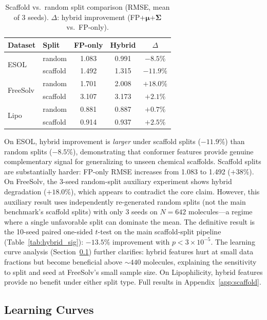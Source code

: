 \documentclass[sigconf]{acmart}
\newcommand{\rev}[1]{#1}
\begin{document}
\begin{table}[t]
\caption{Scaffold vs.\ random split comparison (RMSE, mean of 3 seeds). $\Delta$: hybrid improvement (FP+$\boldsymbol{\mu}$+$\boldsymbol{\Sigma}$ vs.\ FP-only).}
\label{tab:scaffold}
\centering
\small
\begin{tabular}{@{}llccc@{}}
\toprule
Dataset & Split & FP-only & Hybrid & $\Delta$ \\
\midrule
\multirow{2}{*}{ESOL} & random & 1.083 & 0.991 & $-8.5\%$ \\
                       & scaffold & 1.492 & 1.315 & $\mathbf{-11.9\%}$ \\
\midrule
\multirow{2}{*}{FreeSolv} & random & 1.701 & 2.008 & $+18.0\%$ \\
                            & scaffold & 3.107 & 3.173 & $+2.1\%$ \\
\midrule
\multirow{2}{*}{Lipo} & random & 0.881 & 0.887 & $+0.7\%$ \\
                       & scaffold & 0.914 & 0.937 & $+2.5\%$ \\
\bottomrule
\end{tabular}
\end{table}

On ESOL, hybrid improvement is \emph{larger} under scaffold splits ($-11.9\%$) than random splits ($-8.5\%$), demonstrating that conformer features provide genuine complementary signal for generalizing to unseen chemical scaffolds. Scaffold splits are substantially harder: FP-only RMSE increases from 1.083 to 1.492 ($+38\%$). \rev{On FreeSolv, the 3-seed random-split auxiliary experiment shows hybrid degradation ($+18.0\%$), which appears to contradict the core claim. However, this auxiliary result uses independently re-generated random splits (not the main benchmark's scaffold splits) with only 3 seeds on $N{=}642$ molecules---a regime where a single unfavorable split can dominate the mean. The definitive result is the 10-seed paired one-sided $t$-test on the main scaffold-split pipeline (Table~\ref{tab:hybrid_sig}): $-13.5\%$ improvement with $p < 3 \times 10^{-5}$. The learning curve analysis (Section~\ref{sec:learning}) further clarifies: hybrid features hurt at small data fractions but become beneficial above ${\sim}440$ molecules, explaining the sensitivity to split and seed at FreeSolv's small sample size.} On Lipophilicity, hybrid features provide no benefit under either split type. Full results in Appendix~\ref{app:scaffold}.

\subsection{Learning Curves}
\label{sec:learning}
\end{document}
